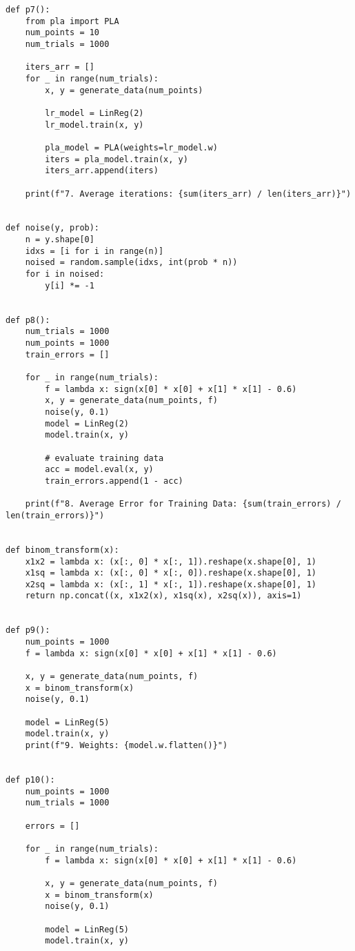 \documentclass[answers]{exam}
\begin{document}
\begin{verbatim}
def p7():
    from pla import PLA
    num_points = 10
    num_trials = 1000

    iters_arr = []
    for _ in range(num_trials):
        x, y = generate_data(num_points)

        lr_model = LinReg(2)
        lr_model.train(x, y)

        pla_model = PLA(weights=lr_model.w)
        iters = pla_model.train(x, y)
        iters_arr.append(iters)

    print(f"7. Average iterations: {sum(iters_arr) / len(iters_arr)}")


def noise(y, prob):
    n = y.shape[0]
    idxs = [i for i in range(n)]
    noised = random.sample(idxs, int(prob * n))
    for i in noised:
        y[i] *= -1


def p8():
    num_trials = 1000
    num_points = 1000
    train_errors = []

    for _ in range(num_trials):
        f = lambda x: sign(x[0] * x[0] + x[1] * x[1] - 0.6)
        x, y = generate_data(num_points, f)
        noise(y, 0.1)
        model = LinReg(2)
        model.train(x, y)

        # evaluate training data
        acc = model.eval(x, y)
        train_errors.append(1 - acc)

    print(f"8. Average Error for Training Data: {sum(train_errors) / len(train_errors)}")


def binom_transform(x):
    x1x2 = lambda x: (x[:, 0] * x[:, 1]).reshape(x.shape[0], 1)
    x1sq = lambda x: (x[:, 0] * x[:, 0]).reshape(x.shape[0], 1)
    x2sq = lambda x: (x[:, 1] * x[:, 1]).reshape(x.shape[0], 1)
    return np.concat((x, x1x2(x), x1sq(x), x2sq(x)), axis=1)


def p9():
    num_points = 1000
    f = lambda x: sign(x[0] * x[0] + x[1] * x[1] - 0.6)

    x, y = generate_data(num_points, f)
    x = binom_transform(x)
    noise(y, 0.1)

    model = LinReg(5)
    model.train(x, y)
    print(f"9. Weights: {model.w.flatten()}")


def p10():
    num_points = 1000
    num_trials = 1000

    errors = []

    for _ in range(num_trials):
        f = lambda x: sign(x[0] * x[0] + x[1] * x[1] - 0.6)

        x, y = generate_data(num_points, f)
        x = binom_transform(x)
        noise(y, 0.1)

        model = LinReg(5)
        model.train(x, y)


\end{verbatim}
\end{document}
